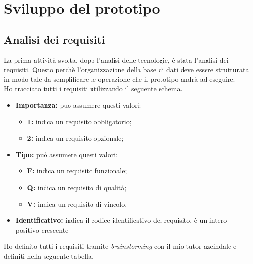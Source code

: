 \section{Sviluppo del prototipo}
\subsection{Analisi dei requisiti}
La prima attività svolta, dopo l'analisi delle tecnologie, è stata l'analisi dei requisiti. Questo perchè l'organizzazione della base di dati deve essere strutturata in modo tale da semplificare le operazione che il prototipo andrà ad eseguire.\\
Ho tracciato tutti i requisiti utilizzando il seguente schema.\\
\begin{itemize}
	\item \textbf{Importanza:} può assumere questi valori:
  		\begin{itemize}
    		\item \textbf{1:} indica un requisito obbligatorio;
    		\item \textbf{2:} indica un requisito opzionale;
  		\end{itemize}
  	\item \textbf{Tipo:} può assumere questi valori:
  		\begin{itemize}
   		 	\item \textbf{F:} indica un requisito funzionale;
    		\item \textbf{Q:} indica un requisito di qualità;
    		\item \textbf{V:} indica un requisito di vincolo.
  		\end{itemize}
  	\item \textbf{Identificativo:} indica il codice identificativo del requisito, è un intero positivo crescente.
\end{itemize}
Ho definito tutti i requisiti tramite \textit{brainstorming} con il mio tutor azeindale e definiti nella seguente tabella.
\label{tab:rec}
